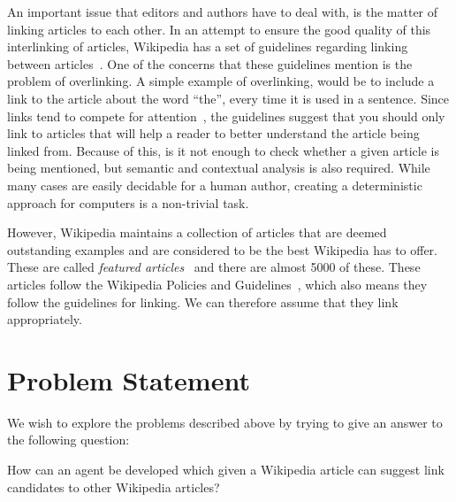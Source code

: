 An important issue that editors and authors have to deal with, is the matter of linking articles to each other. In an attempt to ensure the good quality of this interlinking of articles, Wikipedia has a set of guidelines regarding linking between articles~\cite{wiki-manual-of-style-overlinking}. 
One of the concerns that these guidelines mention is the problem of overlinking. A simple example of overlinking, would be to include a link to the article about the word \enquote{the}, every time it is used in a sentence. Since links tend to compete for attention~\cite{hyperlink-structure-using-logs}, the guidelines suggest that you should only link to articles that will help a reader to better understand the article being linked from. Because of this, is it not enough to check whether a given article is being mentioned, but semantic and contextual analysis is also required. While many cases are easily decidable for a human author, creating a deterministic approach for computers is a non-trivial task.

However, Wikipedia maintains a collection of articles that are deemed outstanding examples and are considered to be the best Wikipedia has to offer. These are called \emph{featured articles}~\cite{wiki-featured-articles} and there are almost 5000 of these. These articles follow the Wikipedia Policies and Guidelines~\cite{wiki-editor-guidelines}, which also means they follow the guidelines for linking. We can therefore assume that they link appropriately. 


\section{Problem Statement}
\label{sec:problem_statement}
We wish to explore the problems described above by trying to give an answer to the following question:

\begin{formal}
How can an agent be developed which given a Wikipedia article can suggest link candidates to other Wikipedia articles?
\end{formal}

